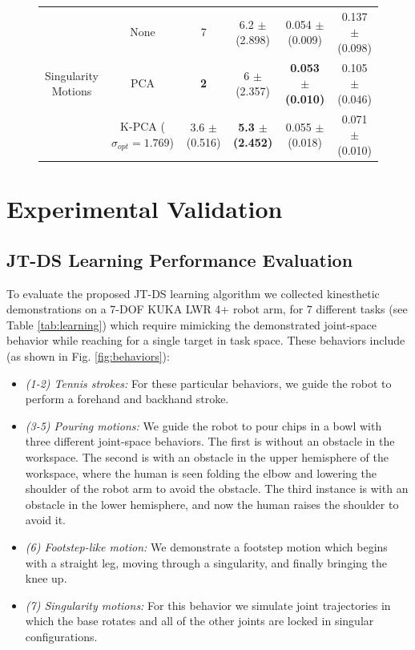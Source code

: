 \documentclass[letterpaper, 10 pt, conference,fleqn]{ieeeconf}
\begin{document}
\begin{figure}[!ht]
\begin{minipage}[b]{0.7\textwidth}
{\begin{tabular}{cc|cc|cc}
	\multicolumn{1}{c}{\multirow{3}{*}{Singularity Motions}} & None & 7 & 6.2 $\pm$ (2.898) & 0.054 $\pm$ (0.009) & 0.137 $\pm$ (0.098)  \\
    \multicolumn{1}{c}{\multirow{3}{*}{($N=10,M=1467$)}} & PCA & \textbf{2} & 6 $\pm$ (2.357) & \textbf{ 0.053 $\pm$ (0.010) } & \cellcolor{blue!10} 0.105 $\pm$ (0.046) \\	
	& K-PCA ($\sigma_{opt} = 1.769$) & 3.6 $\pm$ (0.516) & \textbf{5.3 $\pm$ (2.452)} & 0.055 $\pm$ (0.018) & \cellcolor{blue!15} 0.071 $\pm$ (0.010)   \\ \hline\hline
\end{tabular}}
    \end{minipage}
    \vspace{-20pt}
\end{figure}

\newpage
\section{Experimental Validation} \label{Sec:Exp}
\subsection{JT-DS Learning Performance  Evaluation}
To evaluate the proposed JT-DS learning algorithm we collected kinesthetic demonstrations on a 7-DOF KUKA LWR 4+ robot arm, for 7 different tasks (see Table \ref{tab:learning}) which require mimicking the demonstrated joint-space behavior while reaching for a single target in task space. These behaviors include (as shown in Fig. \ref{fig:behaviors}):
\begin{itemize}[leftmargin=*]
\item \textit{(1-2) Tennis strokes:} For these particular behaviors, we guide the robot to perform a forehand and backhand stroke.  
\item \textit{(3-5) Pouring motions:} We guide the robot to pour chips in a bowl with three different joint-space behaviors. The first is without an obstacle in the workspace. The second is with an obstacle in the upper hemisphere of the workspace, where the human is seen folding the elbow and lowering the shoulder of the robot arm to avoid the obstacle. The third instance is with an obstacle in the lower hemisphere, and now the human raises the shoulder to avoid it.
\item \textit{(6) Footstep-like motion:} We demonstrate a footstep motion which begins with a straight leg, moving through a singularity, and finally bringing the knee up.
\item \textit{(7) Singularity motions:} For this behavior we simulate joint trajectories in which the base rotates and all of the other joints are locked in singular configurations.
\end{itemize}
\end{document}
